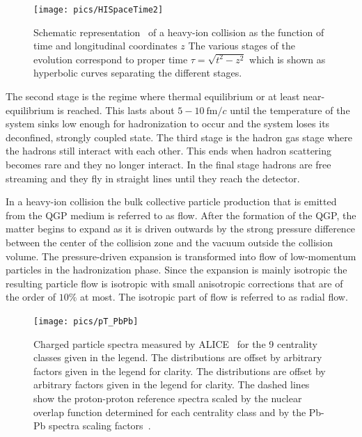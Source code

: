 \begin{figure}[htb]
\centering
               \texttt{[image: pics/HISpaceTime2]}
        \caption[Schematic representation of a heavy-ion collision]{Schematic representation~\cite{Romatschke:2009im} of a heavy-ion collision as the function of time and longitudinal coordinates $z$ The various stages of the evolution correspond to proper time $\tau=\sqrt{t^2-z^2}$ which is shown as hyperbolic curves separating the different stages.}
        	\label{fig:HISpaceTime}
\end{figure}

The second stage is the regime where thermal equilibrium or at least near-equilibrium is reached. This lasts about $5-10\ \mathrm{fm}/c$ until the temperature of the system sinks low enough for hadronization to occur and the system loses its deconfined, strongly coupled state.
The third stage is the hadron gas stage where the hadrons still interact with each other. This ends when hadron scattering becomes rare and they no longer interact. In the final stage hadrons are free streaming and they fly in straight lines until they reach the detector.






In a heavy-ion collision the bulk collective particle production that is emitted from the QGP medium is referred to as flow. After the formation of the QGP, the matter begins to expand as it is driven outwards by the strong pressure difference between the center of the collision zone and the vacuum outside the collision volume. The pressure-driven expansion is transformed into flow of low-momentum particles in the hadronization phase. Since the expansion is mainly isotropic the resulting particle flow is isotropic with small anisotropic corrections that are of the order of $10\%$ at most. The isotropic part of flow is referred to as radial flow. 

\begin{figure}[b!]
\centering
\texttt{[image: pics/pT\_PbPb]}
\caption[Charged particle spectra]{ Charged particle spectra measured by ALICE~\cite{PRL106032301} for the 9 centrality classes given in the legend. The distributions are offset by arbitrary factors given in the legend for clarity. The distributions are offset by arbitrary factors given in the legend for clarity. The dashed lines show the proton-proton reference spectra scaled by the nuclear overlap function determined for each centrality class and by the Pb-Pb spectra scaling factors~\cite{PRL106032301}.}
\label{fig:dndpt}
\end{figure}


